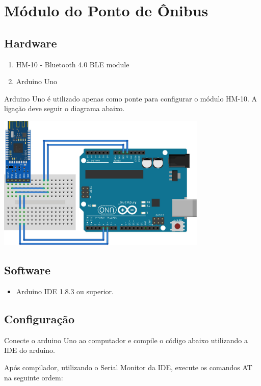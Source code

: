 \documentclass[
	12pt,				%
	oneside,			%
	a4paper,			%
	brazil				%
]{abntex2}
\begin{document}
\section{Módulo do Ponto de Ônibus}

\subsection{Hardware}

\begin{enumerate}
\item HM-10 - Bluetooth 4.0 BLE module
\item Arduino Uno
\end{enumerate}

Arduino Uno é utilizado apenas como ponte para configurar o módulo HM-10. A ligação deve seguir o diagrama abaixo.

\includegraphics[width=10cm, center]{images/arduino-hm10}

\subsection{Software}

\begin{itemize}
\item Arduino IDE 1.8.3 ou superior. 
\end{itemize}

\subsection{Configuração}

Conecte o arduino Uno ao computador e compile o código abaixo utilizando a IDE do arduino.



Após compilador, utilizando o Serial Monitor da IDE, execute os comandos AT na seguinte ordem:
\end{document}
